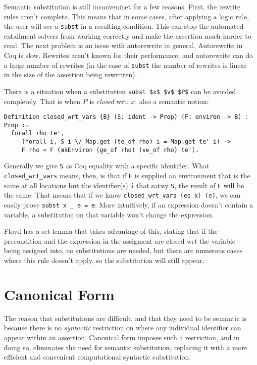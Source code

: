 \documentclass{puthesis}
\begin{document}
Semantic substitution is still inconveninet for a few reasons. First,
the rewrite rules aren't complete. This means that in some cases, after
applying a logic rule, the user will see a \lstinline|subst| in a
resulting condition. This can stop the automated entailment
solvers from working correctly and make the assertion much harder
to read. The next problem is an issue with autorewrite in general.
Autorewrite in Coq is slow. Rewrites aren't known for their 
performance, and autorewrite can do a large number of rewrites
(in the case of \lstinline|subst| the number of rewrites is
linear in the size of the assertion being rewritten). 

There is a situation when a substitution \lstinline|subst $x$ $v$ $P$| can
be avoided completely. That is when $P$ is \emph{closed} wrt. 
$x$, also a semantic notion:

\begin{lstlisting}
Definition closed_wrt_vars {B} (S: ident -> Prop) (F: environ -> B) : Prop := 
  forall rho te',  
     (forall i, S i \/ Map.get (te_of rho) i = Map.get te' i) ->
     F rho = F (mkEnviron (ge_of rho) (ve_of rho) te').
\end{lstlisting}

Generally we give \lstinline|S| as Coq equality with a specific identifier. 
What \lstinline|closed_wrt_vars| means, then, is that if \lstinline|F|
is supplied an environment that is the same at all locations but 
the identifier(s) \lstinline|i| that satisy \lstinline|S|, the
result of \lstinline|F| will be the same. That means that if we know
\lstinline|closed_wrt_vars (eq x) (e)|, we can easily prove
\lstinline|subst x _ e = e|. More intuitively, if an expression
doesn't contain a variable, a substitution on that variable
won't change the expression. 

Floyd has a set lemma that takes advantage of this, stating that if
the precondition and the expression in the assigment
are closed wrt the variable being assigned into, no substitutions are
needed, but there are numerous cases where this rule doesn't apply, 
so the substitution will still appear. 

\section{Canonical Form}

The reason that substitutions are difficult, and that they need
to be semantic is because there is no \emph{syntactic} restriction
on where any individual identifier can appear within an assertion.
Canonical form imposes such a restriction, and in doing so, eliminates
the need for semantic substitution, replacing it with a more
efficient and convenient computational syntactic substitution.
\end{document}
